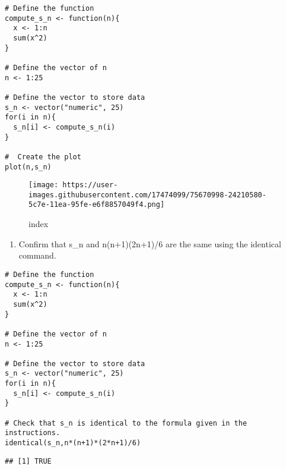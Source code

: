 \documentclass[]{article}
\providecommand{\tightlist}{%
  \setlength{\itemsep}{0pt}\setlength{\parskip}{0pt}}
\begin{document}
\begin{verbatim}
# Define the function
compute_s_n <- function(n){
  x <- 1:n
  sum(x^2)
}

# Define the vector of n
n <- 1:25

# Define the vector to store data
s_n <- vector("numeric", 25)
for(i in n){
  s_n[i] <- compute_s_n(i)
}

#  Create the plot 
plot(n,s_n)
\end{verbatim}

\begin{figure}
\centering
\texttt{[image: https://user-images.githubusercontent.com/17474099/75670998-24210580-5c7e-11ea-95fe-e6f8857049f4.png]}
\caption{index}
\end{figure}

\begin{enumerate}
\def\labelenumi{\arabic{enumi}.}
\setcounter{enumi}{9}
\tightlist
\item
  Confirm that s\_n and n(n+1)(2n+1)/6 are the same using the identical
  command.
\end{enumerate}

\begin{verbatim}
# Define the function
compute_s_n <- function(n){
  x <- 1:n
  sum(x^2)
}

# Define the vector of n
n <- 1:25

# Define the vector to store data
s_n <- vector("numeric", 25)
for(i in n){
  s_n[i] <- compute_s_n(i)
}

# Check that s_n is identical to the formula given in the instructions.
identical(s_n,n*(n+1)*(2*n+1)/6)
\end{verbatim}

\begin{verbatim}
## [1] TRUE
\end{verbatim}
\end{document}
